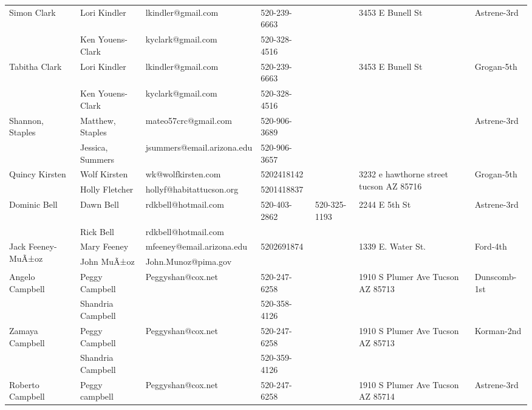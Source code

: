 \documentclass[landscape]{book}\usepackage[]{graphicx}\usepackage[]{color}
\begin{document}
\begin{longtable}{p{70pt}|p{75pt}|p{120pt}|p{60pt}|p{60pt}|p{100pt}|p{70pt}|}
\hline
\multirow{2}{70pt}{Simon Clark} & Lori Kindler & lkindler@gmail.com & 520-239-6663 &  & \multirow{2}{100pt}{3453 E Bunell St} & \multirow{2}{70pt}{Astrene-3rd}\\
 & Ken Youens-Clark & kyclark@gmail.com & 520-328-4516 &  & & \\
\hline
\multirow{2}{70pt}{Tabitha Clark} & Lori Kindler & lkindler@gmail.com & 520-239-6663 &  & \multirow{2}{100pt}{3453 E Bunell St} & \multirow{2}{70pt}{Grogan-5th}\\
 & Ken Youens-Clark & kyclark@gmail.com & 520-328-4516 &  & & \\
\hline
\multirow{2}{70pt}{Shannon, Staples} & Matthew, Staples & mateo57crc@gmail.com & 520-906-3689 &  & \multirow{2}{100pt}{} & \multirow{2}{70pt}{Astrene-3rd}\\
 & Jessica, Summers & jsummers@email.arizona.edu & 520-906-3657 &  & & \\
\hline
\multirow{2}{70pt}{Quincy Kirsten} & Wolf Kirsten & wk@wolfkirsten.com & 5202418142 &  & \multirow{2}{100pt}{3232 e hawthorne street tucson AZ 85716} & \multirow{2}{70pt}{Grogan-5th}\\
 & Holly Fletcher  & hollyf@habitattucson.org & 5201418837 &  & & \\
\hline
\multirow{2}{70pt}{Dominic Bell} & Dawn Bell & rdkbell@hotmail.com & 520-403-2862 & 520-325-1193 & \multirow{2}{100pt}{2244 E 5th St} & \multirow{2}{70pt}{Astrene-3rd}\\
 & Rick Bell & rdkbell@hotmail.com &  &  & & \\
\hline
\multirow{2}{70pt}{Jack Feeney-MuÃ±oz} & Mary Feeney & mfeeney@email.arizona.edu & 5202691874 &  & \multirow{2}{100pt}{1339 E. Water St.} & \multirow{2}{70pt}{Ford-4th}\\
 & John MuÃ±oz & John.Munoz@pima.gov &  &  & & \\
\hline
\multirow{2}{70pt}{Angelo Campbell } & Peggy Campbell  & Peggyshan@cox.net & 520-247-6258 &  & \multirow{2}{100pt}{1910 S Plumer Ave Tucson AZ 85713} & \multirow{2}{70pt}{Dunscomb-1st}\\
 & Shandria Campbell  &  & 520-358-4126 &  & & \\
\hline
\multirow{2}{70pt}{Zamaya Campbell } & Peggy Campbell  & Peggyshan@cox.net & 520-247-6258 &  & \multirow{2}{100pt}{1910 S Plumer Ave Tucson AZ 85713} & \multirow{2}{70pt}{Korman-2nd}\\
 & Shandria Campbell  &  & 520-359-4126 &  & & \\
\hline
\multirow{2}{70pt}{Roberto Campbell } & Peggy campbell & Peggyshan@cox.net & 520-247-6258 &  & \multirow{2}{100pt}{1910 S Plumer Ave Tucson AZ 85714} & \multirow{2}{70pt}{Astrene-3rd}\\

\end{longtable}
\end{document}
